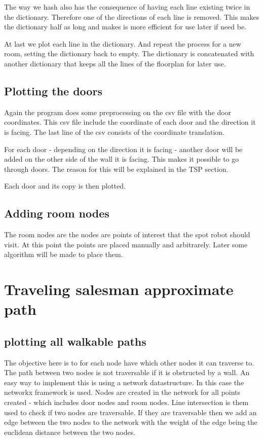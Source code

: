 The way we hash also has the consequence of having each line existing twice in the dictionary. Therefore one of the directions of each line is removed. This makes the dictionary half as long and makes is more efficient for use later if need be.

At last we plot each line in the dictionary.
And repeat the process for a new room, setting the dictionary back to empty. The dictionary is concatenated with another dictionary that keeps all the lines of the floorplan for later use.


\subsection{Plotting the doors}
Again the program does some preprocessing on the csv file with the door coordinates. This csv file include the coordinate of each door and the direction it is facing. The last line of the csv consists of the coordinate translation.

For each door - depending on the direction it is facing - another door will be added on the other side of the wall it is facing. This makes it possible to go through doors. The reason for this will be explained in the TSP section.

Each door and its copy is then plotted.

\subsection{Adding room nodes}
The room nodes are the nodes are points of interest that the spot robot should visit. At this point the points are placed manually and arbitrarely. Later some algorithm will be made to place them.

\section{Traveling salesman approximate path}
\subsection{plotting all walkable paths}
The objective here is to for each node have which other nodes it can traverse to. The path between two nodes is not traversable if it is obstructed by a wall. 
An easy way to implement this is using a network datastructure. In this case the networkx framework is used. Nodes are created in the network for all points created - which includes door nodes and room nodes. 
Line intersection is them used to check if two nodes are traversable.
If they are traversable then we add an edge between the two nodes to the network with the weight of the edge being the euclidean distance between the two nodes.


